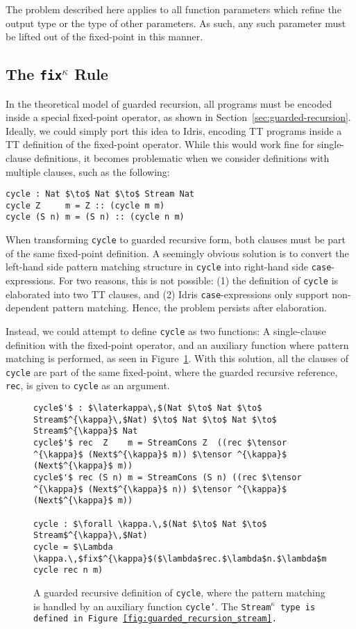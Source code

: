 The problem described here applies to all function parameters which refine the
output type or the type of other parameters. As such, any such parameter must be
lifted out of the fixed-point in this manner.


\subsection{The \texttt{fix$^\kappa$} Rule}
\label{sec:fixkappa-rule}
In the theoretical model of guarded recursion, all programs must be encoded
inside a special fixed-point operator, as shown in
Section~\ref{sec:guarded-recursion}. Ideally, we could simply port this idea to
Idris, encoding TT programs inside a TT definition of the fixed-point
operator. While this would work fine for single-clause definitions, it becomes
problematic when we consider definitions with multiple clauses, such as the
following: 

\begin{lstlisting}[mathescape]
cycle : Nat $\to$ Nat $\to$ Stream Nat
cycle Z     m = Z :: (cycle m m)
cycle (S n) m = (S n) :: (cycle n m)
\end{lstlisting}

When transforming \texttt{cycle} to guarded recursive form, both clauses must be part
of the same fixed-point definition. A seemingly obvious solution is to convert
the left-hand side pattern matching structure in \texttt{cycle} into right-hand
side \texttt{case}-expressions. For two reasons, this is not possible: (1) the
definition of \texttt{cycle} is elaborated into two TT clauses, and (2) Idris
\texttt{case}-expressions only support non-dependent pattern matching. Hence,
the problem persists after elaboration.

Instead, we could attempt to define \texttt{cycle} as two functions: A
single-clause definition with the fixed-point operator, and an auxiliary
function where pattern matching is performed, as seen in
Figure~\ref{fig:cycle_guarded}. With this solution, all the clauses of
\texttt{cycle} are part of the same fixed-point, where the guarded recursive reference,
\texttt{rec}, is given to \texttt{cycle} as an argument.

\begin{figure}[h]
\begin{lstlisting}[mathescape]
cycle$'$ : $\laterkappa\,$(Nat $\to$ Nat $\to$ Stream$^{\kappa}\,$Nat) $\to$ Nat $\to$ Nat $\to$ Stream$^{\kappa}$ Nat
cycle$'$ rec  Z    m = StreamCons Z  ((rec $\tensor ^{\kappa}$ (Next$^{\kappa}$ m)) $\tensor ^{\kappa}$ (Next$^{\kappa}$ m))
cycle$'$ rec (S n) m = StreamCons (S n) ((rec $\tensor ^{\kappa}$ (Next$^{\kappa}$ n)) $\tensor ^{\kappa}$ (Next$^{\kappa}$ m))

cycle : $\forall \kappa.\,$(Nat $\to$ Nat $\to$ Stream$^{\kappa}\,$Nat)
cycle = $\Lambda \kappa.\,$fix$^{\kappa}$($\lambda$rec.$\lambda$n.$\lambda$m. cycle rec n m)
\end{lstlisting}
  \caption{A guarded recursive definition of \texttt{cycle}, where the pattern
    matching is handled by an auxiliary function \texttt{cycle'}. The
    \texttt{Stream$^\kappa$ type is defined in Figure~\ref{fig:guarded_recursion_stream}.} }
  \label{fig:cycle_guarded}
\end{figure}


